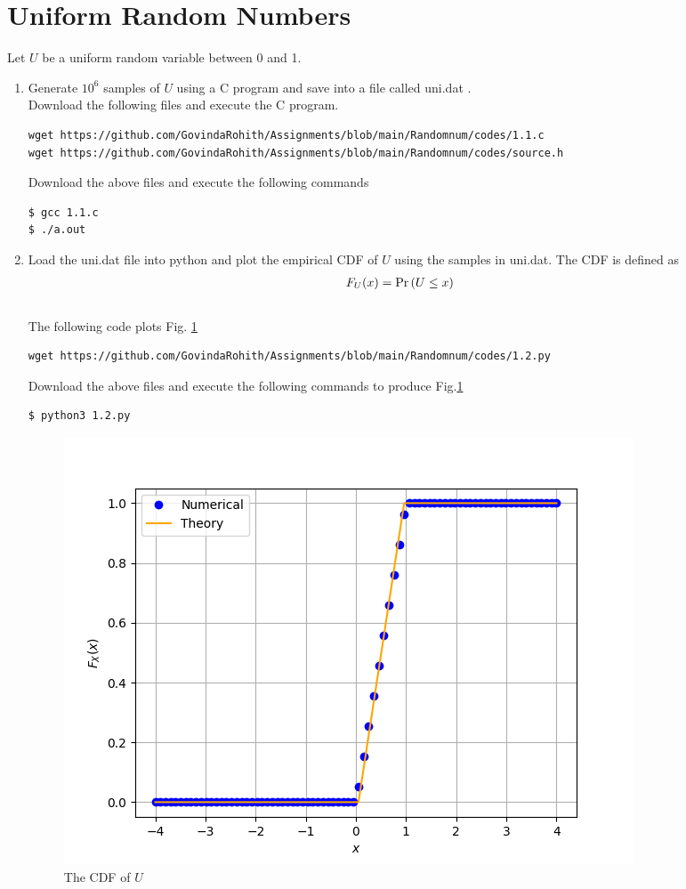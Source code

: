 \documentclass[journal,12pt,twocolumn]{IEEEtran}
\begin{document}
\section{Uniform Random Numbers}
Let $U$ be a uniform random variable between 0 and 1.
\begin{enumerate}[label=\thesection.\arabic*
,ref=\thesection.\theenumi]
\item Generate $10^6$ samples of $U$ using a C program and save into a file called uni.dat .
\\
\solution Download the following files and execute the  C program.
\begin{lstlisting}
wget https://github.com/GovindaRohith/Assignments/blob/main/Randomnum/codes/1.1.c
wget https://github.com/GovindaRohith/Assignments/blob/main/Randomnum/codes/source.h
\end{lstlisting}
Download the above files and execute the following commands
\begin{lstlisting}
$ gcc 1.1.c
$ ./a.out
\end{lstlisting}
\item
Load the uni.dat file into python and plot the empirical CDF of $U$ using the samples in uni.dat. The CDF is defined as
\begin{align}
F_{U}(x) = \Pr\left(U \le x\right)
\end{align}
\\
\solution  The following code plots Fig. \ref{fig:1.2}
\begin{lstlisting}
wget https://github.com/GovindaRohith/Assignments/blob/main/Randomnum/codes/1.2.py
\end{lstlisting}
Download the above files and execute the following commands to produce Fig.\ref{fig:1.2}
\begin{lstlisting}
$ python3 1.2.py
\end{lstlisting}
\begin{figure}[!h]
\centering
\includegraphics[width=\columnwidth]{./figs/1.2.png}
\caption{The CDF of $U$}
\label{fig:1.2}
\end{figure}


\end{enumerate}
\end{document}
